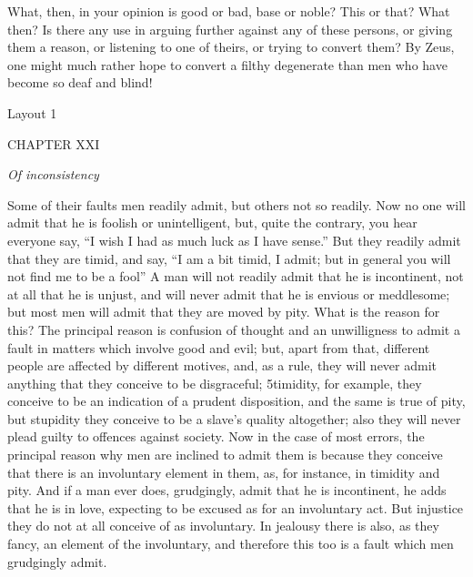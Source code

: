 What, then, in your opinion is good or bad, base or noble? This or that? What then? Is there any use in arguing further against any of these persons, or giving them a reason, or listening to one of theirs, or trying to convert them? By Zeus, one might much rather hope to convert a filthy degenerate than men who have become so deaf and blind!



Layout 1

CHAPTER XXI

\emph{Of inconsistency}

Some of their faults men readily admit, but others not so readily. Now no one will admit that he is foolish or unintelligent, but, quite the contrary, you hear everyone say, ``I wish I had as much luck as I have sense.'' But they readily admit that they are timid, and say, ``I am a bit timid, I admit; but in general you will not find me to be a fool'' A man will not readily admit that he is incontinent, not at all that he is unjust, and will never admit that he is envious or meddlesome; but most men will admit that they are moved by pity. What is the reason for this? The principal reason is confusion of thought and an unwilligness to admit a fault in matters which involve good and evil; but, apart from that, different people are affected by different motives, and, as a rule, they will never admit anything that they conceive to be disgraceful; 5timidity, for example, they conceive to be an indication of a prudent disposition, and the same is true of pity, but stupidity they conceive to be a slave's quality altogether; also they will never plead guilty to offences against society. Now in the case of most errors, the principal reason why men are inclined to admit them is because they conceive that there is an involuntary element in them, as, for instance, in timidity and pity. And if a man ever does, grudgingly, admit that he is incontinent, he adds that he is in love, expecting to be excused as for an involuntary act. But injustice they do not at all conceive of as involuntary. In jealousy there is also, as they fancy, an element of the involuntary, and therefore this too is a fault which men grudgingly admit.

